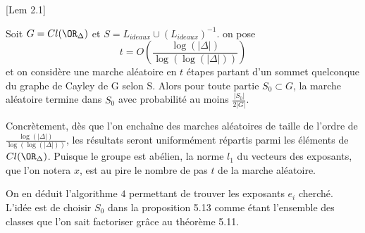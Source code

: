 \begin{Prop}\cite{Jao_2009}[Lem 2.1]
	
	Soit $G = Cl(\OR_{\Delta})$ et $S = L_{ideaux}\cup (L_{ideaux})^{-1}$. on pose
	\begin{equation*}
		t = O\left( \frac{\log(|\Delta|)}{\log(\log(|\Delta|))}\right) 
	\end{equation*} 
	et on considère une marche aléatoire en $t$ étapes partant d'un sommet quelconque du graphe de Cayley de G selon S. Alors pour toute partie $S_{0}\subset G$, la marche aléatoire termine dans $S_{0}$ avec probabilité au moins $\frac{|S_{0}|}{2|G|}$. 
\end{Prop}

\begin{Rem}
	Concrètement, dès que l'on enchaîne des marches aléatoires de taille de l'ordre de $\frac{\log(|\Delta|)}{\log(\log(|\Delta|))}$, les résultats seront uniformément répartis parmi les éléments de $Cl(\OR_{\Delta})$. Puisque le groupe est abélien, la norme $l_{1}$ du vecteurs des exposants, que l'on notera $x$, est au pire le nombre de pas $t$ de la marche aléatoire. 
\end{Rem}

On en déduit l'algorithme $4$ permettant de trouver les exposants $e_{i}$ cherché. L'idée est de choisir $S_{0}$ dans la proposition 5.13 comme étant l'ensemble des classes que l'on sait factoriser grâce au théorème 5.11. 

